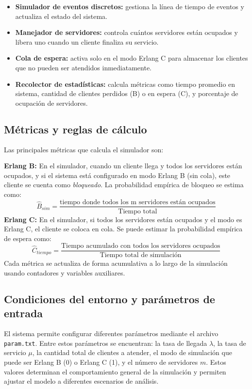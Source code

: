 \documentclass{article}
\begin{document}
\begin{itemize}
    \item \textbf{Simulador de eventos discretos:} gestiona la línea de tiempo de eventos y actualiza el estado del sistema.
    \item \textbf{Manejador de servidores:} controla cuántos servidores están ocupados y libera uno cuando un cliente finaliza su servicio.
    \item \textbf{Cola de espera:} activa solo en el modo Erlang C para almacenar los clientes que no pueden ser atendidos inmediatamente.
    \item \textbf{Recolector de estadísticas:} calcula métricas como tiempo promedio en sistema, cantidad de clientes perdidos (B) o en espera (C), y porcentaje de ocupación de servidores.
\end{itemize}

\subsection{Métricas y reglas de cálculo}

Las principales métricas que calcula el simulador son:

\textbf{Erlang B:} En el simulador, cuando un cliente llega y todos los servidores están ocupados, y si el sistema está configurado en modo Erlang B (sin cola), este cliente se cuenta como \textit{bloqueado}. La probabilidad empírica de bloqueo se estima como:
    \[
        \hat{B}_{sim} = \frac{\text{tiempo donde todos los m servidores están ocupados}}{\text{Tiempo total}}
    \]
\textbf{Erlang C:} En el simulador, si todos los servidores están ocupados y el modo es Erlang C, el cliente se coloca en cola. Se puede estimar la probabilidad empírica de espera como:
    \[
        \hat{C}_{tiempo} = \frac{\text{Tiempo acumulado con todos los servidores ocupados}}{\text{Tiempo total de simulación}}
    \]
Cada métrica se actualiza de forma acumulativa a lo largo de la simulación usando contadores y variables auxiliares.

\subsection{Condiciones del entorno y parámetros de entrada}

El sistema permite configurar diferentes parámetros mediante el archivo \texttt{param.txt}. Entre estos parámetros se encuentran: la tasa de llegada $\lambda$, la tasa de servicio $\mu$, la cantidad total de clientes a atender, el modo de simulación que puede ser Erlang B (0) o Erlang C (1), y el número de servidores $m$. Estos valores determinan el comportamiento general de la simulación y permiten ajustar el modelo a diferentes escenarios de análisis.
\end{document}
